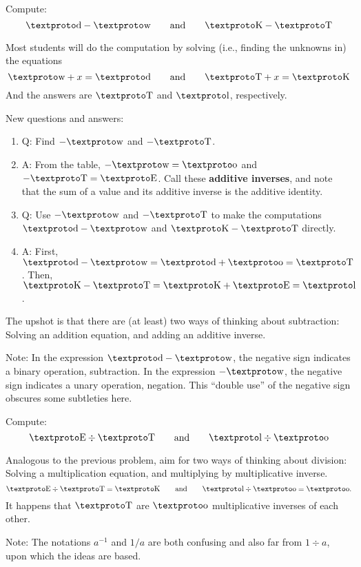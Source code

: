 \documentclass[nooutcomes,instructornotes]{ximera}
\begin{document}
\begin{problem} Compute:
\[
\loo - \la \qquad\text{and}\qquad \ld - \lc
\]
\begin{teachingnote}
Most students will do the computation by solving (i.e., finding the unknowns in) the equations  
\[
\la + x = \loo  \qquad\text{and}\qquad \lc + x = \ld
\]
And the answers are $\lc$ and $\lh$, respectively.  

New questions and answers:  
\begin{enumerate}
\item Q: Find $-\la$ and $-\lc$.  
\item A: From the table, $-\la=\li$ and $-\lc=\lf$.  Call these \textbf{additive inverses}, and note that the sum of a value and its additive inverse is the additive identity.  
\item Q: Use $-\la$ and $-\lc$ to make the computations $\loo - \la$ and $\ld - \lc$ directly. 
\item A: First, $\loo - \la = \loo + \li =\lc$.  Then, $\ld - \lc = \ld + \lf = \lh$.  
\end {enumerate}

The upshot is that there are (at least) two ways of thinking about subtraction:  Solving an addition equation, and adding an additive inverse.  

Note: In the expression $\loo - \la$, the negative sign indicates a binary operation, subtraction.  In the expression $-\la$, the negative sign indicates a unary operation, negation.  This ``double use'' of the negative sign obscures some subtleties here.  
\end{teachingnote}
\end{problem}

\begin{problem} Compute:
\[
\lf \div \lc \qquad\text{and}\qquad \lh \div \li
\]
\begin{teachingnote}
Analogous to the previous problem, aim for two ways of thinking about division:  Solving a multiplication equation, and multiplying by multiplicative inverse. 
\[
\lf \div \lc = \ld \qquad\text{and}\qquad \lh \div \li = \li. \\
\]
It happens that $\lc$ are $\li$ multiplicative inverses of each other.  

Note:  The notations $a^{-1}$ and $1/a$ are both confusing and also far from $1\div a$, upon which the ideas are based.  
\end{teachingnote}
\end{problem}
\end{document}
